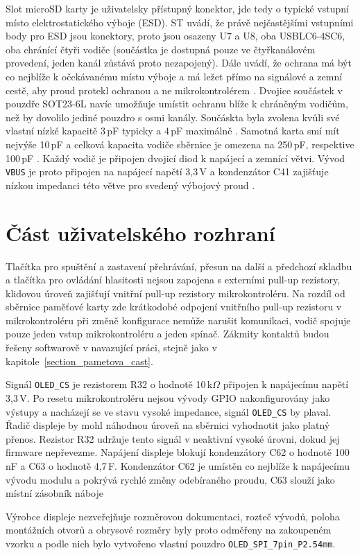 Slot microSD karty je uživatelsky přístupný konektor, jde tedy o typické vstupní místo elektrostatického výboje (ESD). ST uvádí, že právě nejčastějšími vstupními body pro ESD jsou konektory, proto jsou osazeny U7 a U8, oba USBLC6-4SC6, oba chránící čtyři vodiče (součástka je dostupná pouze ve čtyřkanálovém provedení, jeden kanál zůstává proto nezapojený). Dále uvádí, že ochrana má být co nejblíže k očekávanému místu výboje a má ležet přímo na signálové a zemní cestě, aby proud protekl ochranou a ne mikrokontrolérem \cite{an5612_st}. Dvojice součástek v pouzdře SOT23-6L navíc umožňuje umístit ochranu blíže k chráněným vodičům, než by dovolilo jediné pouzdro s osmi kanály. Součáskta byla zvolena kvůli své vlastní nízké kapacitě 3\,pF typicky a 4\,pF maximálně \cite{datasheet_usblc6}. Samotná karta smí mít nejvýše 10\,pF a celková kapacita vodiče sběrnice je omezena na 250\,pF, respektive 100\,pF \cite[s.~3-8, tab.~3-5]{manual_sandisk_sd}. Každý vodič je připojen dvojicí diod k napájecí a zemnící větvi. Vývod \texttt{VBUS} je proto připojen na napájecí napětí 3,3\,V a kondenzátor C41 zajišťuje nízkou impedanci této větve pro svedený výbojový proud \cite{datasheet_usblc6}.


\section{Část uživatelského rozhraní}
Tlačítka pro spuštění a zastavení přehrávání, přesun na další a předchozí skladbu a tlačítka pro ovládání hlasitosti nejsou zapojena s externími pull-up rezistory, klidovou úroveň zajišťují vnitřní pull-up rezistory mikrokontroléru. Na rozdíl od sběrnice paměťové karty zde krátkodobé odpojení vnitřního pull-up rezistoru v mikrokontroléru při změně konfigurace nemůže narušit komunikaci, vodič spojuje pouze jeden vstup mikrokontroléru a jeden spínač. Zákmity kontaktů budou řešeny softwarově v navazující práci, stejně jako v kapitole~\ref{section_pametova_cast}.

Signál \texttt{OLED\_CS} je rezistorem R32 o hodnotě 10\,k$\Omega$ připojen k napájecímu napětí 3,3\,V. Po resetu mikrokontroléru nejsou vývody GPIO nakonfigurovány jako výstupy a nacházejí se ve stavu vysoké impedance, signál \texttt{OLED\_CS} by plaval. Řadič displeje by mohl náhodnou úroveň na sběrnici vyhodnotit jako platný přenos. Rezistor R32 udržuje tento signál v neaktivní vysoké úrovni, dokud jej firmware nepřevezme. Napájení displeje blokují kondenzátory C62 o hodnotě 100\,nF a C63 o hodnotě 4,7\,\textmu F. Kondenzátor C62 je umístěn co nejblíže k napájecímu vývodu modulu a pokrývá rychlé změny odebíraného proudu, C63 slouží jako místní zásobník náboje

Výrobce displeje nezveřejňuje rozměrovou dokumentaci, rozteč vývodů, poloha montážních otvorů a obrysové rozměry byly proto odměřeny na zakoupeném vzorku a podle nich bylo vytvořeno vlastní pouzdro \texttt{OLED\_SPI\_7pin\_P2.54mm}.
